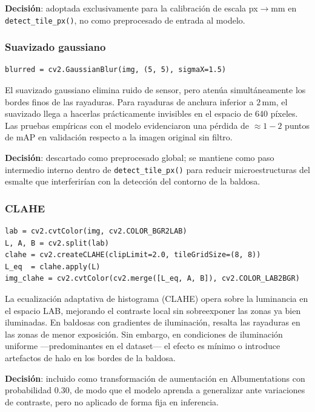 \documentclass[12pt,a4paper]{article}
\begin{document}
\textbf{Decisión}: adoptada exclusivamente para la calibración de escala px$\to$mm
en \texttt{detect\_tile\_px()}, no como preprocesado de entrada al modelo.

\subsubsection{Suavizado gaussiano}

\begin{lstlisting}[caption={Suavizado gaussiano con kernel 5$\times$5}]
blurred = cv2.GaussianBlur(img, (5, 5), sigmaX=1.5)
\end{lstlisting}

El suavizado gaussiano elimina ruido de sensor, pero atenúa simultáneamente los
bordes finos de las rayaduras. Para rayaduras de anchura inferior a $2\,$mm, el
suavizado llega a hacerlas prácticamente invisibles en el espacio de 640 píxeles.
Las pruebas empíricas con el modelo evidenciaron una pérdida de $\approx 1{-}2$ puntos
de mAP en validación respecto a la imagen original sin filtro.

\textbf{Decisión}: descartado como preprocesado global; se mantiene como paso
intermedio interno dentro de \texttt{detect\_tile\_px()} para reducir microestructuras
del esmalte que interferirían con la detección del contorno de la baldosa.

\subsubsection{CLAHE}

\begin{lstlisting}[caption={CLAHE en canal L del espacio de color LAB}]
lab = cv2.cvtColor(img, cv2.COLOR_BGR2LAB)
L, A, B = cv2.split(lab)
clahe = cv2.createCLAHE(clipLimit=2.0, tileGridSize=(8, 8))
L_eq  = clahe.apply(L)
img_clahe = cv2.cvtColor(cv2.merge([L_eq, A, B]), cv2.COLOR_LAB2BGR)
\end{lstlisting}

La ecualización adaptativa de histograma (CLAHE) opera sobre la luminancia en el
espacio LAB, mejorando el contraste local sin sobreexponer las zonas ya bien iluminadas.
En baldosas con gradientes de iluminación, resalta las rayaduras en las zonas de menor
exposición. Sin embargo, en condiciones de iluminación uniforme —predominantes en el
dataset— el efecto es mínimo o introduce artefactos de halo en los bordes de la baldosa.

\textbf{Decisión}: incluido como transformación de aumentación en Albumentations con
probabilidad 0.30, de modo que el modelo aprenda a generalizar ante variaciones de
contraste, pero no aplicado de forma fija en inferencia.
\end{document}
